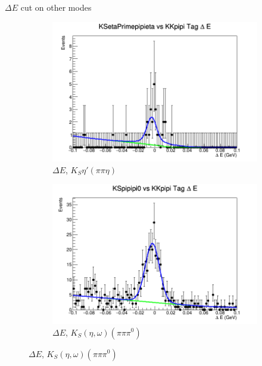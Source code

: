 \documentclass{beamer}
\begin{document}
\begin{frame}{$\Delta E$ cut on other modes}
\begin{figure}
\begin{subfigure}{0.4\textwidth}
      \includegraphics[width=\textwidth]{KSetaPrimepipietaTagDeltaE.png}
      \caption{$\Delta E$, $K_S\eta'(\pi\pi\eta)$}
    \end{subfigure}%
    \begin{subfigure}{0.4\textwidth}
      \centering
      \includegraphics[width=\textwidth]{KSpipipi0TagDeltaE.png}
      \caption{$\Delta E$, $K_S(\eta, \omega)(\pi\pi\pi^0)$}
    \end{subfigure}
  \end{figure}
\end{frame}
\end{document}
